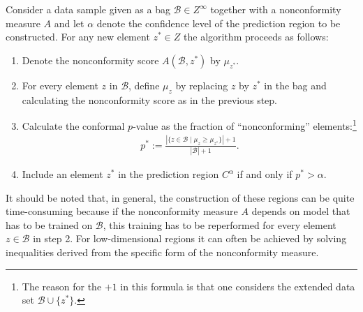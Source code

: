     \begin{construct}\label{data:cp}
        Consider a data sample given as a bag $\mathcal{B}\in Z^\infty$ together with a nonconformity measure $A$ and let $\alpha$ denote the confidence level of the prediction region to be constructed. For any new element $z^*\in Z$ the algorithm proceeds as follows:
        \begin{enumerate}
            \item Denote the nonconformity score $A(\mathcal{B},z^*)$ by $\mu_{z^*}$.
            \item For every element $z$ in $\mathcal{B}$, define $\mu_z$ by replacing $z$ by $z^*$ in the bag and calculating the nonconformity score as in the previous step.
            \item Calculate the conformal $p$-value as the fraction of ``nonconforming'' elements:\footnote{The reason for the $+1$ in this formula is that one considers the extended data set $\mathcal{B}\cup\{z^*\}$.}
                \begin{gather}
                    \label{data:tcp}
                    p^* := \frac{|\{z\in\mathcal{B}\mid\mu_z\geq\mu_{z^*}\}|+1}{|\mathcal{B}|+1}.
                \end{gather}
            \item Include an element $z^*$ in the prediction region $C^\alpha$ if and only if $p^*>\alpha$.
        \end{enumerate}
        It should be noted that, in general, the construction of these regions can be quite time-consuming because if the nonconformity measure $A$ depends on model that has to be trained on $\mathcal{B}$, this training has to be reperformed for every element $z\in\mathcal{B}$ in step 2. For low-dimensional regions it can often be achieved by solving inequalities derived from the specific form of the nonconformity measure.
    \end{construct}

